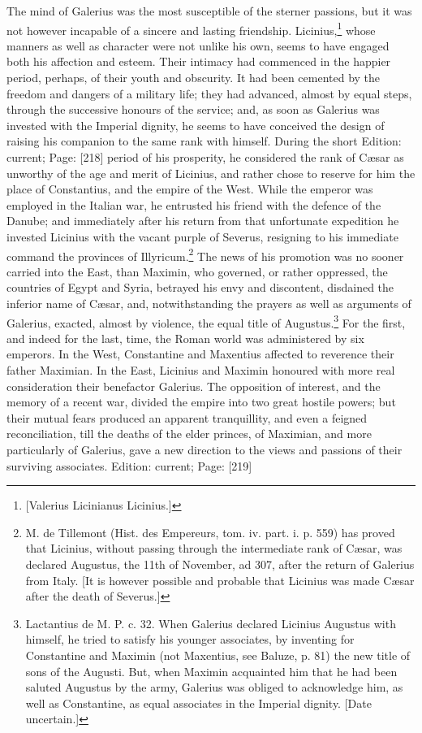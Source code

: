 The mind of Galerius was the most susceptible of the sterner passions, but it was not however incapable of a sincere and lasting friendship. Licinius,\footnote{[Valerius Licinianus Licinius.]} whose manners as well as character were not unlike his own, seems to have engaged both his affection and esteem. Their intimacy had commenced in the happier period, perhaps, of their youth and obscurity. It had been cemented by the freedom and dangers of a military life; they had advanced, almost by equal steps, through the successive honours of the service; and, as soon as Galerius was invested with the Imperial dignity, he seems to have conceived the design of raising his companion to the same rank with himself. During the short Edition: current; Page: [218] period of his prosperity, he considered the rank of Cæsar as unworthy of the age and merit of Licinius, and rather chose to reserve for him the place of Constantius, and the empire of the West. While the emperor was employed in the Italian war, he entrusted his friend with the defence of the Danube; and immediately after his return from that unfortunate expedition he invested Licinius with the vacant purple of Severus, resigning to his immediate command the provinces of Illyricum.\footnote{M. de Tillemont (Hist. des Empereurs, tom. iv. part. i. p. 559) has proved that Licinius, without passing through the intermediate rank of Cæsar, was declared Augustus, the 11th of November, ad 307, after the return of Galerius from Italy. [It is however possible and probable that Licinius was made Cæsar after the death of Severus.]} The news of his promotion was no sooner carried into the East, than Maximin, who governed, or rather oppressed, the countries of Egypt and Syria, betrayed his envy and discontent, disdained the inferior name of Cæsar, and, notwithstanding the prayers as well as arguments of Galerius, exacted, almost by violence, the equal title of Augustus.\footnote{Lactantius de M. P. c. 32. When Galerius declared Licinius Augustus with himself, he tried to satisfy his younger associates, by inventing for Constantine and Maximin (not Maxentius, see Baluze, p. 81) the new title of sons of the Augusti. But, when Maximin acquainted him that he had been saluted Augustus by the army, Galerius was obliged to acknowledge him, as well as Constantine, as equal associates in the Imperial dignity. [Date uncertain.]} For the first, and indeed for the last, time, the Roman world was administered by six emperors. In the West, Constantine and Maxentius affected to reverence their father Maximian. In the East, Licinius and Maximin honoured with more real consideration their benefactor Galerius. The opposition of interest, and the memory of a recent war, divided the empire into two great hostile powers; but their mutual fears produced an apparent tranquillity, and even a feigned reconciliation, till the deaths of the elder princes, of Maximian, and more particularly of Galerius, gave a new direction to the views and passions of their surviving associates.
Edition: current; Page: [219]

